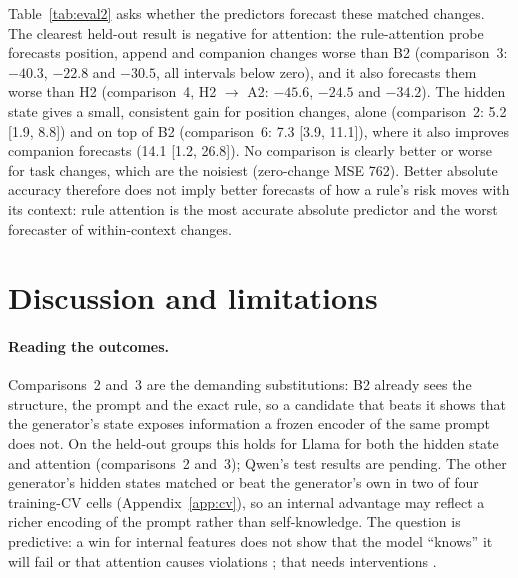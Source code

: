 \documentclass{article}
\newcommand{\cto}{$\rightarrow$}
\begin{document}
Table~\ref{tab:eval2} asks whether the predictors forecast these matched changes. The clearest held-out result is
negative for attention: the rule-attention probe forecasts position, append and companion changes worse than B2
(comparison~3: $-40.3$, $-22.8$ and $-30.5$, all intervals below zero), and it also forecasts them worse than H2
(comparison~4, H2 \cto{} A2: $-45.6$, $-24.5$ and $-34.2$). The hidden state gives a small, consistent gain for position changes, alone (comparison~2: 5.2 [1.9,
8.8]) and on top of B2 (comparison~6: 7.3 [3.9, 11.1]), where it also improves companion forecasts (14.1 [1.2, 26.8]).
No comparison is clearly better or worse for task changes, which are the noisiest (zero-change MSE 762). Better
absolute accuracy therefore does not imply better forecasts of how a rule's risk moves with its context: rule attention
is the most accurate absolute predictor and the worst forecaster of within-context changes.

\section{Discussion and limitations}
\label{sec:discussion}

\paragraph{Reading the outcomes.} Comparisons~2 and~3 are the demanding substitutions: B2 already sees the structure,
the prompt and the exact rule, so a candidate that beats it shows that the generator's state exposes information a
frozen encoder of the same prompt does not. On the held-out groups this holds for Llama for both the hidden state and attention (comparisons~2 and~3);
Qwen's test results are pending. The other generator's hidden states matched or beat the generator's own in two of four training-CV cells
(Appendix~\ref{app:cv}), so an internal advantage may reflect a richer encoding of the prompt rather than self-knowledge.
The question is predictive: a win for internal features does not show
that the model ``knows'' it will fail or that attention causes violations \citep{jain2019attention,wiegreffe2019attention};
that needs interventions \citep{li2023iti,stolfo2025steering,zhang2024pasta}.
\end{document}
